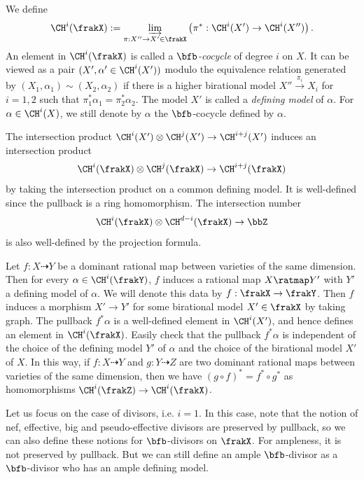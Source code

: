   \begin{definition}
    We define 
    \[ \CH^i(\frakX) := \varinjlim_{\pi:X'' \to X' \in \frakX} \left( \pi^* : \CH^i(X') \to \CH^i(X'') \right). \]
    An element in $\CH^i(\frakX)$ is called a \emph{$\bfb$-cocycle} of degree $i$ on $X$.
    It can be viewed as a pair $(X', \alpha' \in \CH^i(X'))$ modulo the equivalence relation generated by $(X_1, \alpha_1) \sim (X_2, \alpha_2)$ if there is a higher birational model $X'' \xrightarrow{\pi_i} X_i$ for $i=1,2$ such that $\pi_1^* \alpha_1 = \pi_2^* \alpha_2$.
    The model $X'$ is called a \emph{defining model} of $\alpha$.
    For $\alpha \in \CH^i(X)$, we still denote by $\alpha$ the $\bfb$-cocycle defined by $\alpha$.
  \end{definition}

  The intersection product $\CH^i(X') \otimes \CH^j(X') \to \CH^{i+j}(X')$ induces an intersection product
  \[ \CH^i(\frakX) \otimes \CH^j(\frakX) \to \CH^{i+j}(\frakX) \]
  by taking the intersection product on a common defining model.
  It is well-defined since the pullback is a ring homomorphism.
  The intersection number 
  \[ \CH^i(\frakX) \otimes \CH^{d-i}(\frakX) \to \bbZ \]
  is also well-defined by the projection formula.

  Let $f: X \dashrightarrow Y$ be a dominant rational map between varieties of the same dimension.
  Then for every $\alpha \in \CH^i(\frakY)$, $f$ induces a rational map $X \ratmap Y'$ with $Y'$ a defining model of $\alpha$.
  We will denote this data by $f: \frakX \to \frakY$.
  Then $f$ induces a morphism $X' \to Y'$ for some birational model $X' \in \frakX$ by taking graph.
  The pullback $f^* \alpha$ is a well-defined element in $\CH^i(X')$, and hence defines an element in $\CH^i(\frakX)$.
  Easily check that the pullback $f^* \alpha$ is independent of the choice of the defining model $Y'$ of $\alpha$ and the choice of the birational model $X'$ of $X$.
  In this way, if $f: X \dashrightarrow Y$ and $g: Y \dashrightarrow Z$ are two dominant rational maps between varieties of the same dimension, then we have $(g \circ f)^* = f^* \circ g^*$ as homomorphisms $\CH^i(\frakZ) \to \CH^i(\frakX)$.

  Let us focus on the case of divisors, i.e. $i=1$.
  In this case, note that the notion of nef, effective, big and pseudo-effective divisors are preserved by pullback, so we can also define these notions for $\bfb$-divisors on $\frakX$.
  For ampleness, it is not preserved by pullback.
  But we can still define an ample $\bfb$-divisor as a $\bfb$-divisor who has an ample defining model.
  
